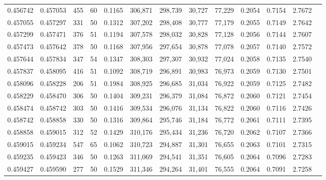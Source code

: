 \begin{tabular}{rrrrrrrrrrrrr}
0.456742 & 0.457053 &   455 &  60 &                                     0.1165 & 306,871 & 298,739 &  30,727 &  77,229 & 0.2054 & 0.7154 & 2.7672 \\
0.457055 & 0.457297 &   331 &  50 &                                     0.1312 & 307,202 & 298,408 &  30,777 &  77,179 & 0.2055 & 0.7149 & 2.7642 \\
0.457299 & 0.457471 &   376 &  51 &                                     0.1194 & 307,578 & 298,032 &  30,828 &  77,128 & 0.2056 & 0.7144 & 2.7607 \\
0.457473 & 0.457642 &   378 &  50 &                                     0.1168 & 307,956 & 297,654 &  30,878 &  77,078 & 0.2057 & 0.7140 & 2.7572 \\
0.457644 & 0.457834 &   347 &  54 &                                     0.1347 & 308,303 & 297,307 &  30,932 &  77,024 & 0.2058 & 0.7135 & 2.7540 \\
0.457837 & 0.458095 &   416 &  51 &                                     0.1092 & 308,719 & 296,891 &  30,983 &  76,973 & 0.2059 & 0.7130 & 2.7501 \\
0.458096 & 0.458228 &   206 &  51 &                                     0.1984 & 308,925 & 296,685 &  31,034 &  76,922 & 0.2059 & 0.7125 & 2.7482 \\
0.458229 & 0.458470 &   306 &  50 &                                     0.1404 & 309,231 & 296,379 &  31,084 &  76,872 & 0.2060 & 0.7121 & 2.7454 \\
0.458474 & 0.458742 &   303 &  50 &                                     0.1416 & 309,534 & 296,076 &  31,134 &  76,822 & 0.2060 & 0.7116 & 2.7426 \\
0.458742 & 0.458858 &   330 &  50 &                                     0.1316 & 309,864 & 295,746 &  31,184 &  76,772 & 0.2061 & 0.7111 & 2.7395 \\
0.458858 & 0.459015 &   312 &  52 &                                     0.1429 & 310,176 & 295,434 &  31,236 &  76,720 & 0.2062 & 0.7107 & 2.7366 \\
0.459015 & 0.459234 &   547 &  65 &                                     0.1062 & 310,723 & 294,887 &  31,301 &  76,655 & 0.2063 & 0.7101 & 2.7315 \\
0.459235 & 0.459423 &   346 &  50 &                                     0.1263 & 311,069 & 294,541 &  31,351 &  76,605 & 0.2064 & 0.7096 & 2.7283 \\
0.459427 & 0.459590 &   277 &  50 &                                     0.1529 & 311,346 & 294,264 &  31,401 &  76,555 & 0.2064 & 0.7091 & 2.7258 \\

\end{tabular}
